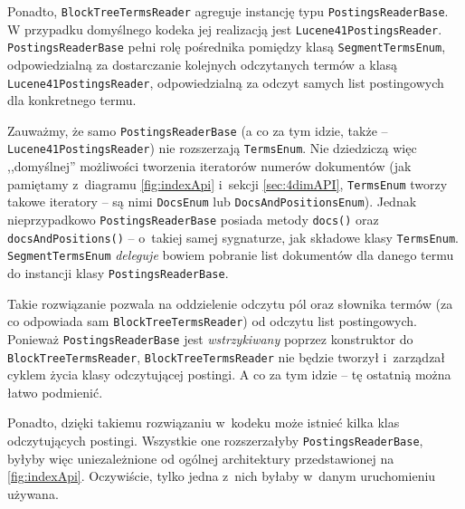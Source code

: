 Ponadto, \texttt{BlockTreeTermsReader} agreguje instancję typu \texttt{PostingsReaderBase}. W przypadku domyślnego kodeka jej realizacją jest \texttt{Lucene41PostingsReader}. \texttt{PostingsReaderBase} pełni rolę pośrednika pomiędzy klasą \texttt{SegmentTermsEnum}, odpowiedzialną za dostarczanie kolejnych odczytanych termów a klasą \texttt{Lucene41PostingsReader}, odpowiedzialną za odczyt samych list postingowych dla konkretnego termu. 

Zauważmy, że samo \texttt{PostingsReaderBase} (a co za tym idzie, także -- \texttt{Lucene41PostingsReader}) nie rozszerzają \texttt{TermsEnum}. Nie dziedziczą więc ,,domyślnej'' możliwości tworzenia iteratorów numerów dokumentów (jak pamiętamy z~diagramu \ref{fig:indexApi} i~sekcji \ref{sec:4dimAPI}, \texttt{TermsEnum} tworzy takowe iteratory -- są nimi \texttt{DocsEnum} lub \texttt{DocsAndPositionsEnum}). Jednak nieprzypadkowo \texttt{PostingsReaderBase} posiada metody \texttt{docs()} oraz \texttt{docsAndPositions()} -- o~takiej samej sygnaturze, jak składowe klasy \texttt{TermsEnum}. \texttt{SegmentTermsEnum} \emph{deleguje} bowiem pobranie list dokumentów dla danego termu do instancji klasy \texttt{PostingsReaderBase}.

Takie rozwiązanie pozwala na oddzielenie odczytu pól oraz słownika termów (za co odpowiada sam \texttt{BlockTreeTermsReader}) od odczytu list postingowych. Ponieważ \texttt{PostingsReaderBase} jest \emph{wstrzykiwany} poprzez konstruktor do \texttt{BlockTreeTermsReader}, \texttt{BlockTreeTermsReader} nie będzie tworzył i~zarządzał cyklem życia klasy odczytującej postingi. A co za tym idzie -- tę ostatnią można łatwo podmienić.

Ponadto, dzięki takiemu rozwiązaniu w~kodeku może istnieć kilka klas odczytujących postingi. Wszystkie one rozszerzałyby \texttt{PostingsReaderBase}, byłyby więc uniezależnione od ogólnej architektury przedstawionej na \ref{fig:indexApi}. Oczywiście, tylko jedna z~nich byłaby w~danym uruchomieniu używana.

